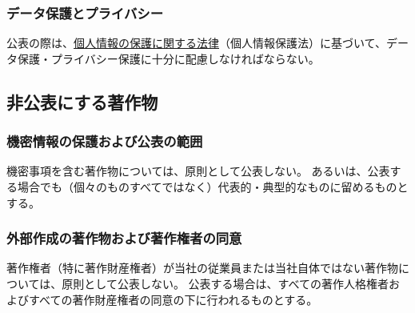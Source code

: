 \subsubsection{データ保護とプライバシー}
公表の際は、\href{https://elaws.e-gov.go.jp/document?lawid=415AC0000000057}{個人情報の保護に関する法律}（個人情報保護法）\cite{online:eGovPersonalInfoProtectionLaw}に基づいて、データ保護・プライバシー保護に十分に配慮しなければならない。


\subsection{非公表にする著作物}

\subsubsection{機密情報の保護および公表の範囲}%
機密事項を含む著作物については、原則として公表しない。
あるいは、公表する場合でも（個々のものすべてではなく）代表的・典型的なものに留めるものとする。

\subsubsection{外部作成の著作物および著作権者の同意}%
著作権者（特に著作財産権者）が当社の従業員または当社自体ではない著作物については、原則として公表しない。
公表する場合は、すべての著作人格権者およびすべての著作財産権者の同意の下に行われるものとする。

